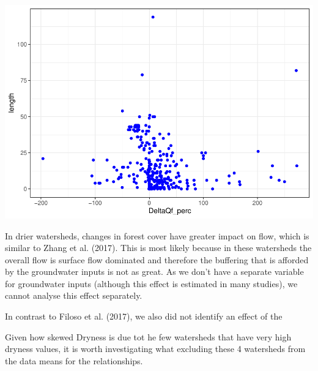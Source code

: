 \documentclass[]{elsarticle} %
\newenvironment{Shaded}{\begin{snugshade}}{\end{snugshade}}
\newcommand{\CommentTok}[1]{\textcolor[rgb]{0.56,0.35,0.01}{\textit{#1}}}
\newcommand{\DataTypeTok}[1]{\textcolor[rgb]{0.13,0.29,0.53}{#1}}
\newcommand{\DecValTok}[1]{\textcolor[rgb]{0.00,0.00,0.81}{#1}}
\newcommand{\KeywordTok}[1]{\textcolor[rgb]{0.13,0.29,0.53}{\textbf{#1}}}
\newcommand{\NormalTok}[1]{#1}
\newcommand{\OperatorTok}[1]{\textcolor[rgb]{0.81,0.36,0.00}{\textbf{#1}}}
\newcommand{\StringTok}[1]{\textcolor[rgb]{0.31,0.60,0.02}{#1}}
\begin{document}
\includegraphics{Forest_and_Water_files/figure-latex/unnamed-chunk-25-1.pdf}

In drier watersheds, changes in forest cover have greater impact on
flow, which is similar to Zhang et al. (2017). This is most likely
because in these watersheds the overall flow is surface flow dominated
and therefore the buffering that is afforded by the groundwater inputs
is not as great. As we don't have a separate variable for groundwater
inputs (although this effect is estimated in many studies), we cannot
analyse this effect separately.

In contrast to Filoso et al. (2017), we also did not identify an effect
of the

Given how skewed Dryness is due tot he few watersheds that have very
high dryness values, it is worth investigating what excluding these 4
watersheds from the data means for the relationships.

\begin{Shaded}
\end{Shaded}
\end{document}
